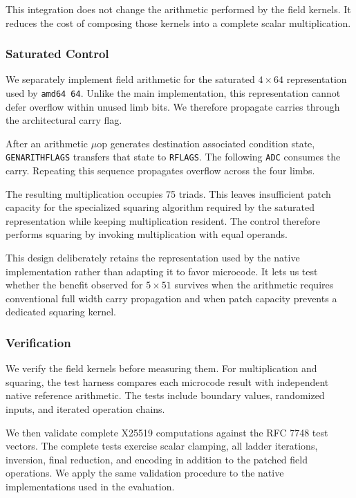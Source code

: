\documentclass[journal=tches,submission]{iacrtrans}
\newcommand{\code}[1]{\texttt{#1}}
\newcommand{\uop}[1]{\code{\textmu#1}}%
\begin{document}
This integration does not change the arithmetic performed by the field kernels.
It reduces the cost of composing those kernels into a complete scalar multiplication.

\subsubsection{Saturated Control}
\label{sec}

We separately implement field arithmetic for the saturated $4\times64$ representation used by \texttt{amd64 64}.
Unlike the main implementation, this representation cannot defer overflow within unused limb bits.
We therefore propagate carries through the architectural carry flag.

After an arithmetic $\mu$op generates destination associated condition state, \uop{GENARITHFLAGS} transfers that state to \code{RFLAGS}.
The following \uop{ADC} consumes the carry.
Repeating this sequence propagates overflow across the four limbs.

The resulting multiplication occupies 75 triads.
This leaves insufficient patch capacity for the specialized squaring algorithm required by the saturated representation while keeping multiplication resident.
The control therefore performs squaring by invoking multiplication with equal operands.

This design deliberately retains the representation used by the native implementation rather than adapting it to favor microcode.
It lets us test whether the benefit observed for $5\times51$ survives when the arithmetic requires conventional full width carry propagation and when patch capacity prevents a dedicated squaring kernel.

\subsubsection{Verification}
\label{sec}

We verify the field kernels before measuring them.
For multiplication and squaring, the test harness compares each microcode result with independent native reference arithmetic.
The tests include boundary values, randomized inputs, and iterated operation chains.

We then validate complete X25519 computations against the RFC 7748 test vectors.
The complete tests exercise scalar clamping, all ladder iterations, inversion, final reduction, and encoding in addition to the patched field operations.
We apply the same validation procedure to the native implementations used in the evaluation.
\end{document}
